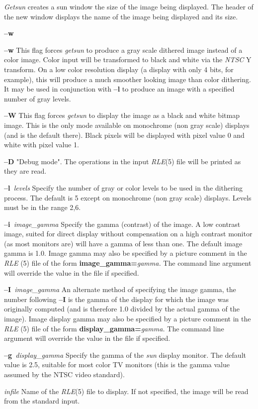 {\it Getsun}
creates a sun window
the size of the image being displayed.  The header of the new window
displays the name of the image being displayed and its size.
\begin{TPlist}{{\bf --w}}
\item[{{\bf --w}}]
This flag forces
{\it getsun}
to produce a gray scale dithered image instead of a color image.
Color input will be transformed to black and white via the
{\it NTSC} Y
transform.  On a low color resolution display (a display with only 4
bits, for example), this will produce a much smoother looking image
than color dithering.  It may be used in conjunction with
{\bf --l}
to produce an image with a specified number of gray levels.
\item[{{\bf --W}}]
This flag forces
{\it getsun}
to display the image as a black and white bitmap image.  This is the
only mode available on monochrome (non gray scale) displays (and is
the default there).  Black pixels will be displayed with pixel value 0
and white with pixel value 1. 
\item[{{\bf --D}}]
"Debug mode".  The operations in the input
{\it RLE}{\rm (5)}
file will be printed as they are read.
\item[{{\bf --l}{\it \ levels}
}]
Specify the number of gray or color levels to be used in the dithering
process. The default is 5 except on monochrome (non gray scale) displays.
Levels must be in the range 2,6.
\item[{{\bf --i}{\it \ image\_gamma}
}]
Specify the gamma (contrast) of the image.  A low contrast image,
suited for direct display without compensation on a high contrast
monitor (as most monitors are) will have a gamma of less than one.
The default image gamma is 1.0.  Image gamma may also be specified by
a picture comment in the
{\it RLE} (5)
file of the form
{\bf image\_gamma=}{\it gamma.}
The command line argument will override the value in the file if specified.
\item[{{\bf --I}{\it \ image\_gamma}
}]
An alternate method of specifying the image gamma, the number
following
{\bf --I}
is the gamma of the display for which the image was originally
computed (and is therefore 1.0 divided by the actual gamma of the
image).  Image display gamma may also be specified by
a picture comment in the
{\it RLE} (5)
file of the form
{\bf display\_gamma=}{\it gamma.}
The command line argument will override the value in the file if specified.
\item[{{\bf --g}{\it \ display\_gamma}
}]
Specify the gamma of the 
{\it sun}
display monitor.  The default value is 2.5, suitable for most color TV
monitors (this is the gamma value assumed by the NTSC video standard).
\item[{{\it infile}}]
Name of the
{\it RLE}{\rm (5)}
file to display.  If not specified, the image will be read from the
standard input.
\end{TPlist}
